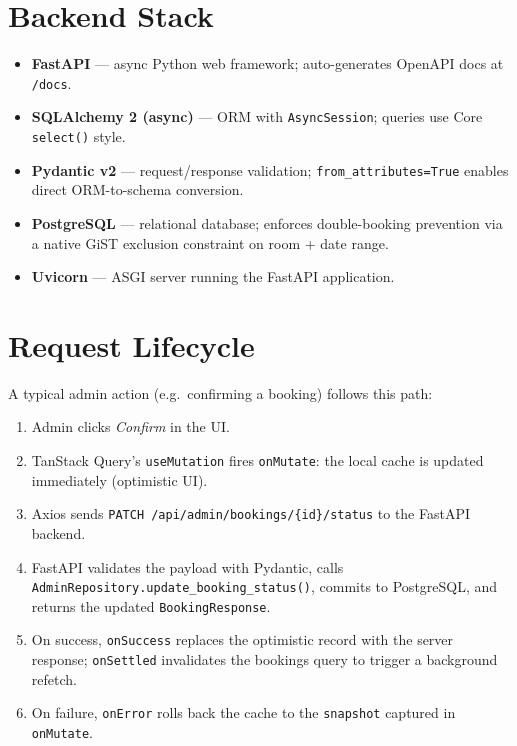 \documentclass[12pt,a4paper]{report}
\begin{document}
\section{Backend Stack}

\begin{itemize}[leftmargin=2em]
  \item \textbf{FastAPI} — async Python web framework; auto-generates OpenAPI
        docs at \texttt{/docs}.
  \item \textbf{SQLAlchemy 2 (async)} — ORM with \texttt{AsyncSession}; queries
        use Core \texttt{select()} style.
  \item \textbf{Pydantic v2} — request/response validation; \texttt{from\_attributes=True}
        enables direct ORM-to-schema conversion.
  \item \textbf{PostgreSQL} — relational database; enforces double-booking
        prevention via a native GiST exclusion constraint on room + date range.
  \item \textbf{Uvicorn} — ASGI server running the FastAPI application.
\end{itemize}

\section{Request Lifecycle}

A typical admin action (e.g.\ confirming a booking) follows this path:

\begin{enumerate}[leftmargin=2em]
  \item Admin clicks \emph{Confirm} in the UI.
  \item TanStack Query's \texttt{useMutation} fires \texttt{onMutate}: the
        local cache is updated immediately (optimistic UI).
  \item Axios sends \texttt{PATCH /api/admin/bookings/\{id\}/status} to the
        FastAPI backend.
  \item FastAPI validates the payload with Pydantic, calls
        \texttt{AdminRepository.update\_booking\_status()}, commits to
        PostgreSQL, and returns the updated \texttt{BookingResponse}.
  \item On success, \texttt{onSuccess} replaces the optimistic record with
        the server response; \texttt{onSettled} invalidates the bookings
        query to trigger a background refetch.
  \item On failure, \texttt{onError} rolls back the cache to the
        \texttt{snapshot} captured in \texttt{onMutate}.
\end{enumerate}
\end{document}

